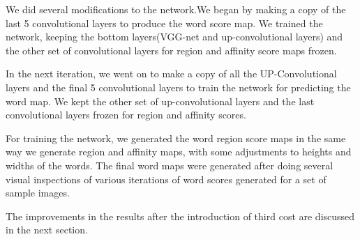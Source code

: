 We did several modifications to the network.We began by making a copy of the last 5 convolutional layers to produce the word score map. We trained the network, keeping the bottom layers(VGG-net and up-convolutional layers) and the other set of convolutional layers for region and affinity score maps frozen.

In the next iteration, we went on to make a copy of all the UP-Convolutional layers and the final 5 convolutional layers to train the network for predicting the word map. We kept the other set of up-convolutional layers and the last convolutional layers frozen for region and affinity scores.

For training the network, we generated the word region score maps in the same way we generate region and affinity maps, with some adjustments to heights and widths of the words. The final word maps were generated after doing several visual inspections of various iterations of word scores generated for a set of sample images.

The improvements in the results after the introduction of third cost are discussed in the next section.

